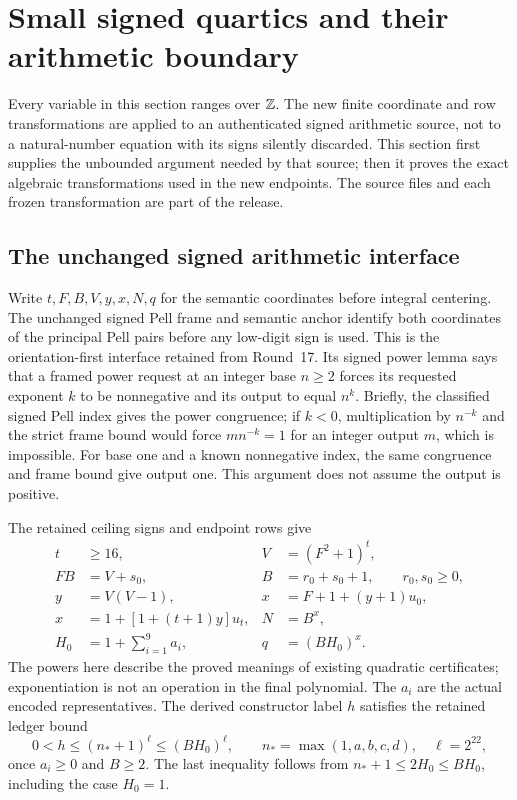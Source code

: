 \section{Small signed quartics and their arithmetic boundary}
\label{sec:signed}
Every variable in this section ranges over $\mathbb Z$. The new finite coordinate
and row transformations are applied to an authenticated signed arithmetic
source, not to a natural-number equation with its signs silently discarded.
This section first supplies the unbounded argument needed by that source;
then it proves the exact algebraic transformations used in the new endpoints.
The source files and each frozen transformation are part of the release.

\subsection{The unchanged signed arithmetic interface}
Write $t,F,B,V,y,x,N,q$ for the semantic coordinates before integral
centering. The unchanged signed Pell frame and semantic anchor identify
both coordinates of the principal Pell pairs before any low-digit sign
is used. This is the orientation-first interface retained from Round~17.
Its signed power lemma says that a framed power request at an integer base
$n\ge2$ forces its requested exponent $k$ to be nonnegative and its output
to equal $n^k$. Briefly, the classified signed Pell index gives the power
congruence; if $k<0$, multiplication by $n^{-k}$ and the strict frame bound
would force $mn^{-k}=1$ for an integer output $m$, which is impossible.
For base one and a known nonnegative index, the same congruence and frame
bound give output one. This argument does not assume the output is positive.

The retained ceiling signs and endpoint rows give
\begin{align}
 t&\ge16,&V&=(F^2+1)^t,\nonumber\\
 FB&=V+s_0,& B&=r_0+s_0+1,\qquad r_0,s_0\ge0,\nonumber\\
 y&=V(V-1),&x&=F+1+(y+1)u_0,\nonumber\\
 x&=1+[1+(t+1)y]u_t,&N&=B^x,\nonumber\\
 H_0&=1+\sum_{i=1}^{9}a_i,&q&=(BH_0)^x.
 \label{eq:signedfront}
\end{align}
The powers here describe the proved meanings of existing quadratic
certificates; exponentiation is not an operation in the final polynomial.
The $a_i$ are the actual encoded representatives. The derived constructor
label $h$ satisfies the retained ledger bound
\begin{equation}\label{eq:labelbound}
 0<h\le(n_*+1)^\ell\le(BH_0)^\ell,
 \qquad n_* =\max(1,a,b,c,d),\quad \ell=2^{22},
\end{equation}
once $a_i\ge0$ and $B\ge2$. The last inequality follows from
$n_*+1\le2H_0\le BH_0$, including the case $H_0=1$.

